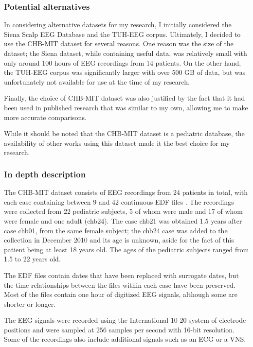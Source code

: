 \subsubsection{Potential alternatives}
In considering alternative datasets for my research, I initially considered the Siena Scalp EEG Database and the \gls{TUH-EEG} corpus. Ultimately, I decided to use the \gls{CHB-MIT} dataset for several reasons. One reason was the size of the dataset; the Siena dataset, while containing useful data, was relatively small with only around 100 hours of \gls{EEG} recordings from 14 patients. On the other hand, the \gls{TUH-EEG} corpus was significantly larger with over 500 GB of data, but was unfortunately not available for use at the time of my research.

Finally, the choice of \gls{CHB-MIT} dataset was also justified by the fact that it had been used in published research that was similar to my own, allowing me to make more accurate comparisons. 

While it should be noted that the \gls{CHB-MIT} dataset is a pediatric database, the availability of other works using this dataset made it the best choice for my research.

\subsubsection{In depth description}
The \gls{CHB-MIT} dataset consists of \gls{EEG} recordings from 24 patients in total, with each case containing between 9 and 42 continuous \gls{EDF} files \cite{shoeb_chb-mit_2010}. The recordings were collected from 22 pediatric subjects, 5 of whom were male and 17 of whom were female and one adult (chb24). The case chb21 was obtained 1.5 years after case chb01, from the same female subject; the chb24 case was added to the collection in December 2010 and its age is unknown, aside for the fact of this patient being at least 18 years old. The ages of the pediatric subjects ranged from 1.5 to 22 years old.

The \gls{EDF} files contain dates that have been replaced with surrogate dates, but the time relationships between the files within each case have been preserved. Most of the files contain one hour of digitized \gls{EEG} signals, although some are shorter or longer. 

The \gls{EEG} signals were recorded using the International 10-20 system of electrode positions and were sampled at 256 samples per second with 16-bit resolution. Some of the recordings also include additional signals such as an \gls{ECG} or a \gls{VNS}. 

